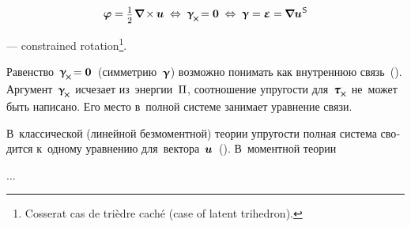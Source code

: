\nopagebreak\vspace{-0.15em}\begin{equation}
\fieldofrotations = \smalldisplaystyleonehalf \hspace{.2ex} \boldnabla \hspace{-0.16ex} \times \hspace{-0.1ex} \fieldofdisplacements
\hspace{.6ex}\Leftrightarrow\hspace{.6ex}
\distortiontensor_{\hspace{-0.25ex}\Xcompanion} \hspace{-0.32ex} = \bm{0}
\hspace{.6ex}\Leftrightarrow\hspace{.6ex}
\distortiontensor = \infinitesimaldeformation = \hspace{-0.12ex} \boldnabla {\fieldofdisplacements}^{\hspace{.1ex}\mathsf{S}}
\end{equation}

\vspace{-0.2em}\noindent
---  constrained rotation\ru{)}\footnote{Cosserat  cas de trièdre caché (case of latent trihedron).}\hspace{-0.32em}.

\begin{otherlanguage}{russian}

Равенство~${\distortiontensor_{\hspace{-0.25ex}\Xcompanion} \hspace{-0.32ex} = \bm{0}}$~(симметрию~$\bm{\upgamma}$) возможно понимать как внутреннюю связь~().
Аргумент~${\distortiontensor_{\hspace{-0.25ex}\Xcompanion}}$ исчезает из~энергии~$\Pi$, соотношение упругости для~${\forcestresstensor_{\hspace{-0.1ex}\Xcompanion}}$ не~может быть написано.
Его место в~полной системе занимает уравнение связи.

В~классической (линейной безмоментной) теории упругости полная система сводится к~одному уравнению для~вектора~$\bm{u}$~().
В~моментной теории

...



\end{otherlanguage}

